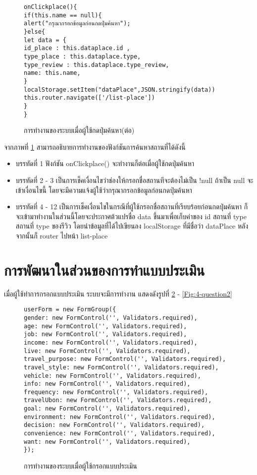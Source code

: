 \begin{figure}[H]
{\lstset{language=Pascal}
\begin{lstlisting}
onClickplace(){
if(this.name == null){
alert("กรุณากรอกข้อมูลก่อนกดปุ่มค้นหา");
}else{
let data = {
id_place : this.dataplace.id ,
type_place : this.dataplace.type,
type_review : this.dataplace.type_review,
name: this.name,
}
localStorage.setItem("dataPlace",JSON.stringify(data))
this.router.navigate(['/list-place'])
}
}
\end{lstlisting}}
\caption{การทำงานของระบบเมื่อผู้ใช้กดปุ่มค้นหา(ต่อ)}
\label{Fig:4-search1}
\end{figure}

จากภาพที่ \ref{Fig:4-search1} สามารถอธิบายการทำงานของฟังก์ชันการค้นหาสถานที่ได้ดังนี้
\begin{itemize}[label={--}]
\item บรรทัดที่ 1 ฟังก์ชัน onClickplace() จะทำงานก็ต่อเมื่อผู้ใช้กดปุ่มค้นหา
\item บรรทัดที่ 2 - 3 เป็นการเช็คเงื่อนไขว่าช่องให้กรอกชื่อสถานทีจะต้องไม่เป็น !null ถ้าเป็น null จะเข้าเงื่อนไขนี้ โดยจะมีความแจ้งผู้ใช้ว่ากรุณากรอกข้อมูลก่อนกดปุ่มค้นหา 
\item บรรทัดที่ 4 - 12 เป็นการเช็คเงื่อนไขในกรณีที่ผู้ใช้กรอกชื่อสถานที่เรียบร้อยก่อนกดปุ่มค้นหา ก็จะเข้ามาทำงานในส่วนนี้โดยจะประกาศต้วแปรชื่อ data ขึ้นมาเพื่อเก็บค่าของ id สถานที่ type สถานที่ type ของรีวิว โดยนำข้อมูลที่ได้ไปเขียนลง localStorage ที่มีชื่อว่า dataPlace หลังจากนั้นก็ router ไปหน้า  list-place  
\end{itemize}
\newpage

\section{การพัฒนาในส่วนของการทำแบบประเมิน}
เมื่อผู้ใช้ทำการกรอกแบบประเมิน ระบบจะมีการทำงาน แสดงดังรูปที่ \ref{Fig:4-question} - \ref{Fig:4-question2}
\begin{figure}[H]
{\begin{lstlisting}
userForm = new FormGroup({
gender: new FormControl('', Validators.required),
age: new FormControl('', Validators.required),
job: new FormControl('', Validators.required),
income: new FormControl('', Validators.required),
live: new FormControl('', Validators.required),
travel_purpose: new FormControl('', Validators.required),
travel_style: new FormControl('', Validators.required),
vehicle: new FormControl('', Validators.required),
info: new FormControl('', Validators.required),
frequency: new FormControl('', Validators.required),
travelUbon: new FormControl('', Validators.required),
goal: new FormControl('', Validators.required),
environment: new FormControl('', Validators.required),
decision: new FormControl('', Validators.required),
convenience: new FormControl('', Validators.required),
want: new FormControl('', Validators.required),
});
\end{lstlisting}}
\caption{การทำงานของระบบเมื่อผู้ใช้กรอกแบบประเมิน}
\label{Fig:4-question}
\end{figure}

